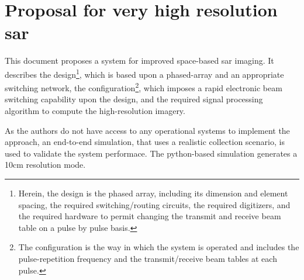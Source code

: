 \section{Proposal for very high resolution \gls{sar}}
This document proposes a system for improved space-based \gls{sar} imaging. It describes the design\footnote{Herein, the design is the phased array, including its dimension and element spacing, the required switching/routing circuits, the required digitizers, and the required hardware to permit changing the transmit and receive beam table on a pulse by pulse basis.}, which is based upon a phased-array and an appropriate switching network, the configuration\footnote{The configuration is the way in which the system is operated and includes the pulse-repetition frequency and the transmit/receive beam tables at each pulse.}, which imposes a rapid electronic beam switching capability upon the design, and the required signal processing algorithm to compute the high-resolution imagery.
\par
As the authors do not have access to any operational systems to implement the approach, an end-to-end simulation, that uses a realistic collection scenario, is used to validate the system performace. The python-based simulation generates a 10cm resolution mode. 
